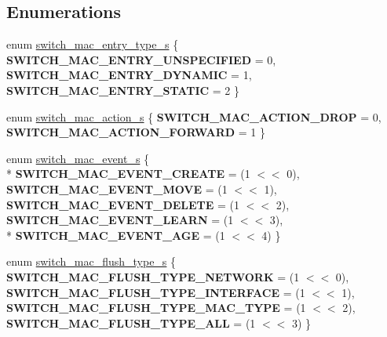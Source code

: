 \subsection*{Enumerations}
\begin{DoxyCompactItemize}
\item 
enum \hyperlink{group__L2_ga8bbe19fdfe987704725c338646303cb4}{switch\+\_\+mac\+\_\+entry\+\_\+type\+\_\+s} \{ {\bfseries S\+W\+I\+T\+C\+H\+\_\+\+M\+A\+C\+\_\+\+E\+N\+T\+R\+Y\+\_\+\+U\+N\+S\+P\+E\+C\+I\+F\+I\+E\+D} = 0, 
{\bfseries S\+W\+I\+T\+C\+H\+\_\+\+M\+A\+C\+\_\+\+E\+N\+T\+R\+Y\+\_\+\+D\+Y\+N\+A\+M\+I\+C} = 1, 
{\bfseries S\+W\+I\+T\+C\+H\+\_\+\+M\+A\+C\+\_\+\+E\+N\+T\+R\+Y\+\_\+\+S\+T\+A\+T\+I\+C} = 2
 \}
\item 
enum \hyperlink{group__L2_ga41cd4aa537a1dfbe6380d619f28e8a6b}{switch\+\_\+mac\+\_\+action\+\_\+s} \{ {\bfseries S\+W\+I\+T\+C\+H\+\_\+\+M\+A\+C\+\_\+\+A\+C\+T\+I\+O\+N\+\_\+\+D\+R\+O\+P} = 0, 
{\bfseries S\+W\+I\+T\+C\+H\+\_\+\+M\+A\+C\+\_\+\+A\+C\+T\+I\+O\+N\+\_\+\+F\+O\+R\+W\+A\+R\+D} = 1
 \}
\item 
enum \hyperlink{group__L2_ga49d8f781f5ef73c8afdbb7abbdb23a60}{switch\+\_\+mac\+\_\+event\+\_\+s} \{ \\*
{\bfseries S\+W\+I\+T\+C\+H\+\_\+\+M\+A\+C\+\_\+\+E\+V\+E\+N\+T\+\_\+\+C\+R\+E\+A\+T\+E} = (1 $<$$<$ 0), 
{\bfseries S\+W\+I\+T\+C\+H\+\_\+\+M\+A\+C\+\_\+\+E\+V\+E\+N\+T\+\_\+\+M\+O\+V\+E} = (1 $<$$<$ 1), 
{\bfseries S\+W\+I\+T\+C\+H\+\_\+\+M\+A\+C\+\_\+\+E\+V\+E\+N\+T\+\_\+\+D\+E\+L\+E\+T\+E} = (1 $<$$<$ 2), 
{\bfseries S\+W\+I\+T\+C\+H\+\_\+\+M\+A\+C\+\_\+\+E\+V\+E\+N\+T\+\_\+\+L\+E\+A\+R\+N} = (1 $<$$<$ 3), 
\\*
{\bfseries S\+W\+I\+T\+C\+H\+\_\+\+M\+A\+C\+\_\+\+E\+V\+E\+N\+T\+\_\+\+A\+G\+E} = (1 $<$$<$ 4)
 \}
\item 
enum \hyperlink{group__L2_ga852b825e1cfbfd08e4bc21e0fc5c548c}{switch\+\_\+mac\+\_\+flush\+\_\+type\+\_\+s} \{ {\bfseries S\+W\+I\+T\+C\+H\+\_\+\+M\+A\+C\+\_\+\+F\+L\+U\+S\+H\+\_\+\+T\+Y\+P\+E\+\_\+\+N\+E\+T\+W\+O\+R\+K} = (1 $<$$<$ 0), 
{\bfseries S\+W\+I\+T\+C\+H\+\_\+\+M\+A\+C\+\_\+\+F\+L\+U\+S\+H\+\_\+\+T\+Y\+P\+E\+\_\+\+I\+N\+T\+E\+R\+F\+A\+C\+E} = (1 $<$$<$ 1), 
{\bfseries S\+W\+I\+T\+C\+H\+\_\+\+M\+A\+C\+\_\+\+F\+L\+U\+S\+H\+\_\+\+T\+Y\+P\+E\+\_\+\+M\+A\+C\+\_\+\+T\+Y\+P\+E} = (1 $<$$<$ 2), 
{\bfseries S\+W\+I\+T\+C\+H\+\_\+\+M\+A\+C\+\_\+\+F\+L\+U\+S\+H\+\_\+\+T\+Y\+P\+E\+\_\+\+A\+L\+L} = (1 $<$$<$ 3)
 \}
\end{DoxyCompactItemize}
